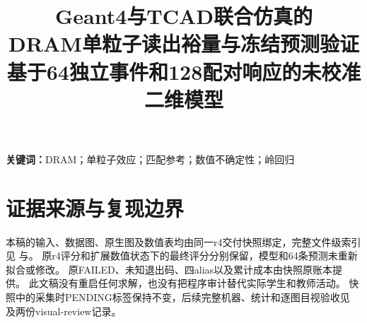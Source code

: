 \documentclass[UTF8,a4paper,zihao=-4,fontset=fandol]{ctexart}
\title{\heiti\Large Geant4与TCAD联合仿真的\\DRAM单粒子读出裕量与冻结预测验证\\[0.5em]\large 基于64独立事件和128配对响应的未校准二维模型}
\author{}\date{\EvidenceDate}
\begin{document}
\maketitle
\begin{abstract}\end{abstract}
\noindent\textbf{关键词：}DRAM；单粒子效应；匹配参考；数值不确定性；岭回归






\FloatBarrier
\clearpage\appendix
\section{证据来源与复现边界}
本稿的输入、数据图、原生图及数值表均由同一r4交付快照绑定，完整文件级索引见
与。
原r4评分和扩展数值状态下的最终评分分别保留，模型和64条预测未重新拟合或修改。
原FAILED、未知退出码、四alias以及累计成本由快照原账本提供。
此文稿没有重启任何求解，也没有把程序审计替代实际学生和教师活动。
快照中的采集时PENDING标签保持不变，后续完整机器、统计和逐图目视验收见
及两份visual-review记录。
\par\medskip\noindent

\end{document}
